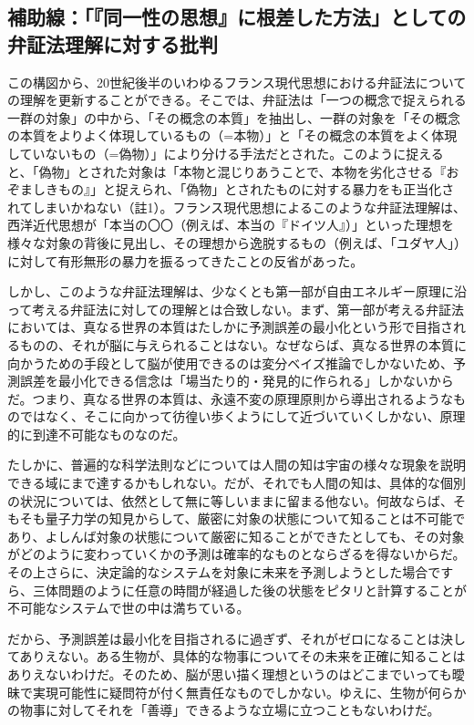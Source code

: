 \subsection{補助線：「『同一性の思想』に根差した方法」としての弁証法理解に対する批判}\label{ux88dcux52a9ux7ddaux540cux4e00ux6027ux306eux601dux60f3ux306bux6839ux5deeux3057ux305fux65b9ux6cd5ux3068ux3057ux3066ux306eux5f01ux8a3cux6cd5ux7406ux89e3ux306bux5bfeux3059ux308bux6279ux5224}

この構図から、20世紀後半のいわゆるフランス現代思想における弁証法についての理解を更新することができる。そこでは、弁証法は「一つの概念で捉えられる一群の対象」の中から、「その概念の本質」を抽出し、一群の対象を「その概念の本質をよりよく体現しているもの（=本物）」と「その概念の本質をよく体現していないもの（=偽物）」により分ける手法だとされた。このように捉えると、「偽物」とされた対象は「本物と混じりあうことで、本物を劣化させる『おぞましきもの』」と捉えられ、「偽物」とされたものに対する暴力をも正当化されてしまいかねない（註1）。フランス現代思想によるこのような弁証法理解は、西洋近代思想が「本当の〇〇（例えば、本当の『ドイツ人』）」といった理想を様々な対象の背後に見出し、その理想から逸脱するもの（例えば、「ユダヤ人」）に対して有形無形の暴力を振るってきたことの反省があった。

しかし、このような弁証法理解は、少なくとも第一部が自由エネルギー原理に沿って考える弁証法に対しての理解とは合致しない。まず、第一部が考える弁証法においては、真なる世界の本質はたしかに予測誤差の最小化という形で目指されるものの、それが脳に与えられることはない。なぜならば、真なる世界の本質に向かうための手段として脳が使用できるのは変分ベイズ推論でしかないため、予測誤差を最小化できる信念は「場当たり的・発見的に作られる」しかないからだ。つまり、真なる世界の本質は、永遠不変の原理原則から導出されるようなものではなく、そこに向かって彷徨い歩くようにして近づいていくしかない、原理的に到達不可能なものなのだ。

たしかに、普遍的な科学法則などについては人間の知は宇宙の様々な現象を説明できる域にまで達するかもしれない。だが、それでも人間の知は、具体的な個別の状況については、依然として無に等しいままに留まる他ない。何故ならば、そもそも量子力学の知見からして、厳密に対象の状態について知ることは不可能であり、よしんば対象の状態について厳密に知ることができたとしても、その対象がどのように変わっていくかの予測は確率的なものとならざるを得ないからだ。その上さらに、決定論的なシステムを対象に未来を予測しようとした場合ですら、三体問題のように任意の時間が経過した後の状態をピタリと計算することが不可能なシステムで世の中は満ちている。

だから、予測誤差は最小化を目指されるに過ぎず、それがゼロになることは決してありえない。ある生物が、具体的な物事についてその未来を正確に知ることはありえないわけだ。そのため、脳が思い描く理想というのはどこまでいっても曖昧で実現可能性に疑問符が付く無責任なものでしかない。ゆえに、生物が何らかの物事に対してそれを「善導」できるような立場に立つこともないわけだ。

